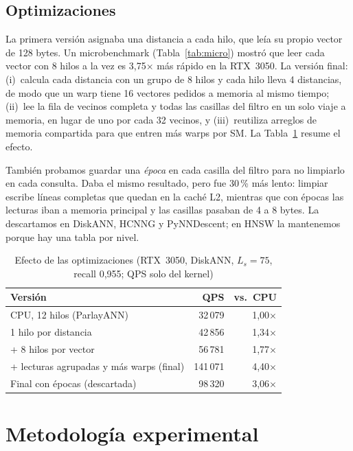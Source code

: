\documentclass[conference,10pt]{IEEEtran}
\newcommand{\x}{$\times$}
\begin{document}
\subsection{Optimizaciones}

La primera versión asignaba una distancia a cada hilo, que leía su propio vector de 128
bytes. Un microbenchmark (Tabla~\ref{tab:micro}) mostró que leer cada vector con 8 hilos
a la vez es 3,75\x{} más rápido en la RTX~3050. La versión final:
(i)~calcula cada distancia con un grupo de 8 hilos y cada hilo lleva 4 distancias, de modo
que un warp tiene 16 vectores pedidos a memoria al mismo tiempo; (ii)~lee la fila de
vecinos completa y todas las casillas del filtro en un solo viaje a memoria, en lugar de
uno por cada 32 vecinos, y (iii)~reutiliza arreglos de memoria compartida para que entren
más warps por SM. La Tabla~\ref{tab:opt} resume el efecto.

También probamos guardar una \emph{época} en cada casilla del filtro para no limpiarlo en
cada consulta. Daba el mismo resultado, pero fue 30\,\% más lento: limpiar escribe líneas
completas que quedan en la caché L2, mientras que con épocas las lecturas iban a memoria
principal y las casillas pasaban de 4 a 8 bytes. La descartamos en DiskANN, HCNNG y
PyNNDescent; en HNSW la mantenemos porque hay una tabla por nivel.

\begin{table}[t]
\centering
\caption{Efecto de las optimizaciones (RTX~3050, DiskANN, $L_s=75$, recall 0,955;
QPS solo del kernel)}
\label{tab:opt}
\begin{tabular}{lrr}
\toprule
Versión & QPS & vs.\ CPU \\
\midrule
CPU, 12 hilos (ParlayANN) & 32\,079 & 1,00\x \\
1 hilo por distancia & 42\,856 & 1,34\x \\
+ 8 hilos por vector & 56\,781 & 1,77\x \\
+ lecturas agrupadas y más warps (final) & 141\,071 & 4,40\x \\
\midrule
Final con épocas (descartada) & 98\,320 & 3,06\x \\
\bottomrule
\end{tabular}
\end{table}

\section{Metodología experimental}
\end{document}
